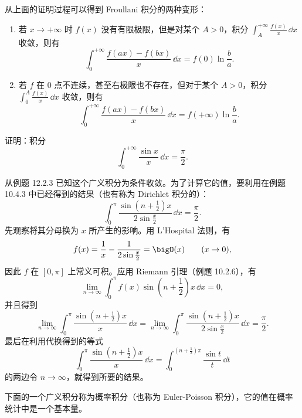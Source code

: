 \begin{xremark}
从上面的证明过程可以得到 Froullani 积分的两种变形：
\begin{enumerate}[label=(\arabic*)]
  \item 若 $x\to+\infty$ 时 $f(x)$ 没有有限极限，但是对某个 $A>0$，积分 $\int_A^{+\infty}\frac{f(x)}x\,\dd x$ 收敛，则有
  \[
    \int_0^{+\infty}\frac{f(ax)-f(bx)}x\,\dd x=f(0)\ln\frac ba.
  \]
  \item 若 $f$ 在 0 点不连续，甚至右极限也不存在，但对于某个 $A>0$，积分 $\int_0^A\frac{f(x)}x\,\dd x$ 收敛，则有
  \[
    \int_0^{+\infty}\frac{f(ax)-f(bx)}x\,\dd x=f(+\infty)\ln\frac ba.
  \]
\end{enumerate}
\end{xremark}

\begin{xexample}[12.3.6（Dirichlet 积分）]
证明：积分
\[
  \int_0^{+\infty}\frac{\sin x}{x}\,\dd x=\frac\pi2.
\]
\end{xexample}
\begin{xsolution}
从例题 12.2.3 已知这个广义积分为条件收敛。为了计算它的值，要利用在例题 10.4.3 中已经得到的结果（也有称为 Dirichlet 积分的）：
\[
  \int_0^\pi\frac{\sin\left(n+\frac12\right)x}{2\sin\frac x2}\,\dd x=\frac\pi2.
\]
先观察将其分母换为 $x$ 所产生的影响。用 L'Hospital 法则，有
\[
  f(x)=\frac1x-\frac1{2\sin\frac x2}=\bigO(x)\qquad(x\to0),
\]
因此 $f$ 在 $[0,\pi]$ 上常义可积。应用 Riemann 引理（例题 10.2.6），有
\[
  \lim_{n\to\infty}\int_0^\pi f(x)\sin\left(n+\frac12\right)x\,\dd x=0,
\]
并且得到
\[
  \lim_{n\to\infty}\int_0^\pi\frac{\sin\left(n+\frac12\right)x}{x}\,\dd x
  =\lim_{n\to\infty}\int_0^\pi\frac{\sin\left(n+\frac12\right)x}{2\sin\frac x2}\,\dd x=\frac\pi2.
\]
最后在利用代换得到的等式
\[
  \int_0^\pi\frac{\sin\left(n+\frac12\right)x}{x}\,\dd x
  =\int_0^{(n+\frac12)\pi}\frac{\sin t}{t}\,\dd t
\]
的两边令 $n\to\infty$，就得到所要的结果。
\end{xsolution}

下面的一个广义积分称为概率积分（也称为 Euler-Poisson 积分），它的值在概率统计中是一个基本量。

